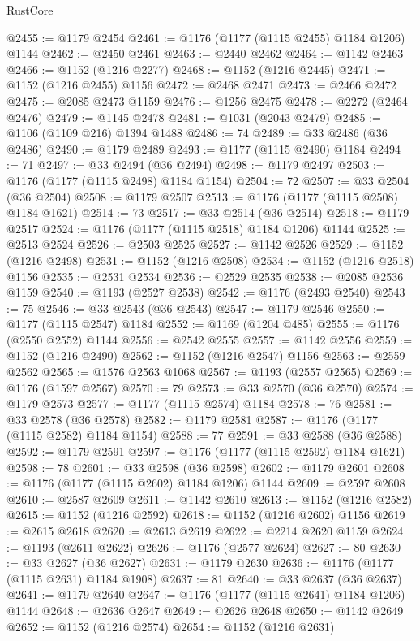 \begin{lexlean}{RustCore}
\begin{coremodule}
@2455 := @1179 @2454
@2461 := @1176 (@1177 (@1115 @2455) @1184 @1206) @1144
@2462 := @2450 @2461
@2463 := @2440 @2462
@2464 := @1142 @2463
@2466 := @1152 (@1216 @2277)
@2468 := @1152 (@1216 @2445)
@2471 := @1152 (@1216 @2455) @1156
@2472 := @2468 @2471
@2473 := @2466 @2472
@2475 := @2085 @2473 @1159
@2476 := @1256 @2475
@2478 := @2272 (@2464 @2476)
@2479 := @1145 @2478
@2481 := @1031 (@2043 @2479)
@2485 := @1106 (@1109 @216) @1394 @1488
@2486 := 74
@2489 := @33 @2486 (@36 @2486)
@2490 := @1179 @2489
@2493 := @1177 (@1115 @2490) @1184
@2494 := 71
@2497 := @33 @2494 (@36 @2494)
@2498 := @1179 @2497
@2503 := @1176 (@1177 (@1115 @2498) @1184 @1154)
@2504 := 72
@2507 := @33 @2504 (@36 @2504)
@2508 := @1179 @2507
@2513 := @1176 (@1177 (@1115 @2508) @1184 @1621)
@2514 := 73
@2517 := @33 @2514 (@36 @2514)
@2518 := @1179 @2517
@2524 := @1176 (@1177 (@1115 @2518) @1184 @1206) @1144
@2525 := @2513 @2524
@2526 := @2503 @2525
@2527 := @1142 @2526
@2529 := @1152 (@1216 @2498)
@2531 := @1152 (@1216 @2508)
@2534 := @1152 (@1216 @2518) @1156
@2535 := @2531 @2534
@2536 := @2529 @2535
@2538 := @2085 @2536 @1159
@2540 := @1193 (@2527 @2538)
@2542 := @1176 (@2493 @2540)
@2543 := 75
@2546 := @33 @2543 (@36 @2543)
@2547 := @1179 @2546
@2550 := @1177 (@1115 @2547) @1184
@2552 := @1169 (@1204 @485)
@2555 := @1176 (@2550 @2552) @1144
@2556 := @2542 @2555
@2557 := @1142 @2556
@2559 := @1152 (@1216 @2490)
@2562 := @1152 (@1216 @2547) @1156
@2563 := @2559 @2562
@2565 := @1576 @2563 @1068
@2567 := @1193 (@2557 @2565)
@2569 := @1176 (@1597 @2567)
@2570 := 79
@2573 := @33 @2570 (@36 @2570)
@2574 := @1179 @2573
@2577 := @1177 (@1115 @2574) @1184
@2578 := 76
@2581 := @33 @2578 (@36 @2578)
@2582 := @1179 @2581
@2587 := @1176 (@1177 (@1115 @2582) @1184 @1154)
@2588 := 77
@2591 := @33 @2588 (@36 @2588)
@2592 := @1179 @2591
@2597 := @1176 (@1177 (@1115 @2592) @1184 @1621)
@2598 := 78
@2601 := @33 @2598 (@36 @2598)
@2602 := @1179 @2601
@2608 := @1176 (@1177 (@1115 @2602) @1184 @1206) @1144
@2609 := @2597 @2608
@2610 := @2587 @2609
@2611 := @1142 @2610
@2613 := @1152 (@1216 @2582)
@2615 := @1152 (@1216 @2592)
@2618 := @1152 (@1216 @2602) @1156
@2619 := @2615 @2618
@2620 := @2613 @2619
@2622 := @2214 @2620 @1159
@2624 := @1193 (@2611 @2622)
@2626 := @1176 (@2577 @2624)
@2627 := 80
@2630 := @33 @2627 (@36 @2627)
@2631 := @1179 @2630
@2636 := @1176 (@1177 (@1115 @2631) @1184 @1908)
@2637 := 81
@2640 := @33 @2637 (@36 @2637)
@2641 := @1179 @2640
@2647 := @1176 (@1177 (@1115 @2641) @1184 @1206) @1144
@2648 := @2636 @2647
@2649 := @2626 @2648
@2650 := @1142 @2649
@2652 := @1152 (@1216 @2574)
@2654 := @1152 (@1216 @2631)

\end{coremodule}
\end{lexlean}
